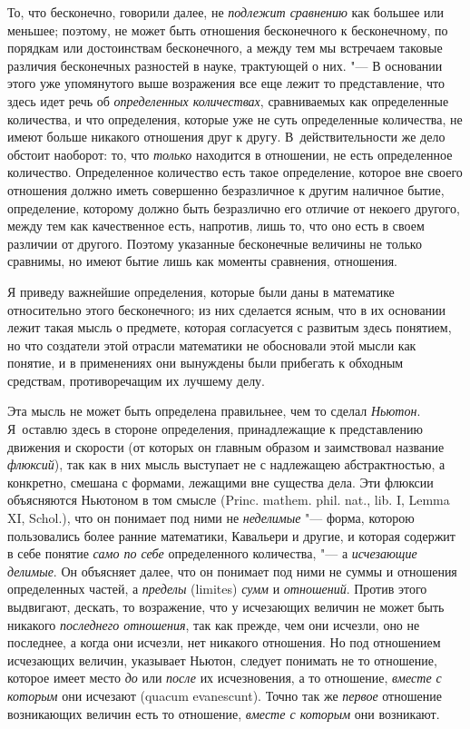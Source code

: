 То, что бесконечно, говорили далее, не {\em подлежит
сравнению} как большее или меньшее; поэтому, не может быть отношения
бесконечного к бесконечному, по порядкам или достоинствам бесконечного, а
между тем мы встречаем таковые различия бесконечных разностей в науке,
трактующей о них. "--- В основании этого уже упомянутого выше возражения все
еще лежит то представление, что здесь идет речь об
{\em определенных количествах}, сравниваемых как
определенные количества, и что определения, которые уже не суть
определенные количества, не имеют больше никакого отношения друг к другу.
В~действительности же дело обстоит наоборот: то, что
{\em только} находится в отношении, не есть
определенное количество. Определенное количество есть такое определение,
которое вне своего отношения должно иметь совершенно безразличное к другим
наличное бытие, определение, которому должно быть безразлично его отличие
от некоего другого, между тем как качественное есть, напротив, лишь то, что
оно есть в своем различии от другого. Поэтому указанные бесконечные
величины не только сравнимы, но имеют бытие лишь как моменты сравнения,
отношения.

Я приведу важнейшие определения, которые были даны в математике относительно
этого бесконечного; из них сделается ясным, что в их основании лежит такая
мысль о предмете, которая согласуется с развитым здесь понятием, но что
создатели этой отрасли математики не обосновали этой мысли как понятие, и в
применениях они вынуждены были прибегать к обходным средствам,
противоречащим их лучшему делу.

Эта мысль не может быть определена правильнее, чем то сделал
{\em Ньютон}. Я~оставлю здесь в стороне определения,
принадлежащие к представлению движения и скорости (от которых он главным
образом и заимствовал название {\em флюксий}), так как
в них мысль выступает не с надлежащею абстрактностью, а конкретно, смешана
с формами, лежащими вне существа дела. Эти флюксии объясняются Ньютоном в
том смысле
(Princ. mathem. phil. nat., lib. I, Lemma XI, Schol.),
что он понимает под ними не
{\em неделимые} "--- форма, которою пользовались более
ранние математики, Кавальери и другие, и которая содержит в себе понятие
{\em само по себе} определенного количества, "--- а
{\em исчезающие делимые}. Он объясняет далее, что он
понимает под ними не суммы и отношения определенных частей, а
{\em пределы} (limites) {\em сумм}
и {\em отношений}. Против этого выдвигают, дескать, то
возражение, что у исчезающих величин не может быть никакого
{\em последнего отношения}, так как прежде, чем они
исчезли, оно не последнее, а когда они исчезли, нет никакого отношения. Но
под отношением исчезающих величин, указывает Ньютон, следует понимать не то
отношение, которое имеет место {\em до} или
{\em после} их исчезновения, а то отношение,
{\em вместе с которым} они исчезают (quacum
evanescunt). Точно так же {\em первое} отношение
возникающих величин есть то отношение, {\em вместе с
которым} они возникают.

